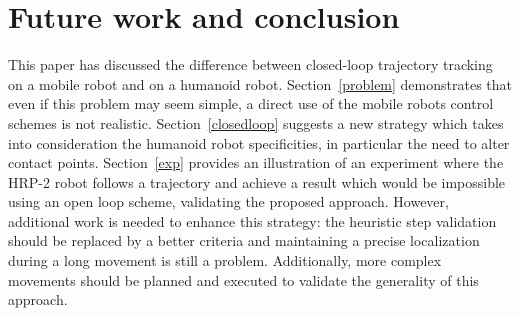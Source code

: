 \section{Future work and conclusion}
%
%
This paper has discussed the difference between closed-loop trajectory
tracking on a mobile robot and on a humanoid
robot. Section~\ref{problem} demonstrates that even if this problem
may seem simple, a direct use of the mobile robots control schemes is
not realistic.  Section~\ref{closedloop} suggests a new strategy which
takes into consideration the humanoid robot specificities, in
particular the need to alter contact points.
%
%
Section~\ref{exp} provides an illustration of an experiment where the
HRP-2 robot follows a trajectory and achieve a result which would be
impossible using an open loop scheme, validating the proposed
approach.
%
%
However, additional work is needed to enhance this strategy: the
heuristic step validation should be replaced by a better criteria and
maintaining a precise localization during a long movement is still a
problem. Additionally, more complex movements should be planned and
executed to validate the generality of this approach.
%
